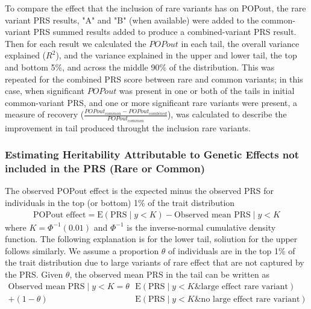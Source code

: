 \documentclass[12pt]{zHenriquesLab-StyleBioRxiv}
\newcommand{\E}{\mbox{E}}
\begin{document}
{{{To compare the effect that the inclusion of rare variants has on POPout, the rare variant PRS results,
"A" and "B" (when available) were added to the common-variant PRS summed results added to produce a 
combined-variant PRS result.  Then for each result we calculated the $POPout$ 
in each tail, the overall variance explained ($R^2$), and the variance
explained in the upper and lower tail, the top and bottom 5\%, and across the middle 90\% of the
distribution.   This was repeated for the combined PRS score between rare and common variants;
in this case, when significant $POPout$ was present in one or both of the tails in initial
common-variant PRS, and one or more significant rare variants were present, 
a measure of recovery ($\frac{{POPout}_{common}-POPout_{combined}}{POPout_{common}}$),
was calculated to describe the improvement in tail produced throught the inclusion rare variants.


\subsubsection*{Estimating Heritability Attributable to Genetic Effects not included in the PRS (Rare or Common)}
The observed POPout effect is the expected minus the observed PRS for
individuals in the top (or bottom) 1\% of the trait distribution
\begin{align}
  \mbox{POPout effect}  = \E(\mbox{PRS} \mid y<K)
  - \mbox{Observed mean PRS}  \mid y<K \label{popout}
\end{align}
where $K=\Phi^{-1}(0.01)$ and $\Phi^{-1}$ is the inverse-normal
cumulative density function. The following explanation is for the
lower tail, soliution for the upper follows similarly. We assume a
proportion $\theta$ of individuals are in the top 1\% of the trait
distribution due to large variants of rare effect that are not
captured by the PRS. Given $\theta$, the observed mean PRS in the tail
can be written as
\begin{align*}
  \mbox{Observed mean PRS} \mid y < K =
  \theta &\E( \mbox{PRS} \mid y<K \mbox{\& large
    effect rare variant})\\
    + (1-\theta) &\E( \mbox{PRS} \mid y<K  \mbox{\& no large
    effect rare variant})
\end{align*}

}}}
\end{document}
